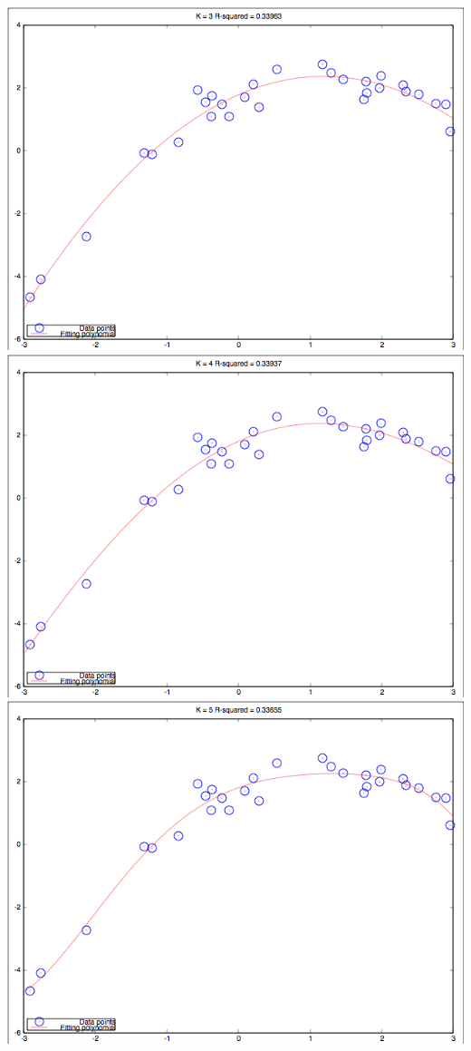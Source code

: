 \documentclass[10pt]{article}
\begin{document}
\begin{itemize}
  \includegraphics[width=\textwidth,height=\textheight,keepaspectratio]{K3}
  \includegraphics[width=\textwidth,height=\textheight,keepaspectratio]{K4}
  \includegraphics[width=\textwidth,height=\textheight,keepaspectratio]{K5}

\end{itemize}
\end{document}
